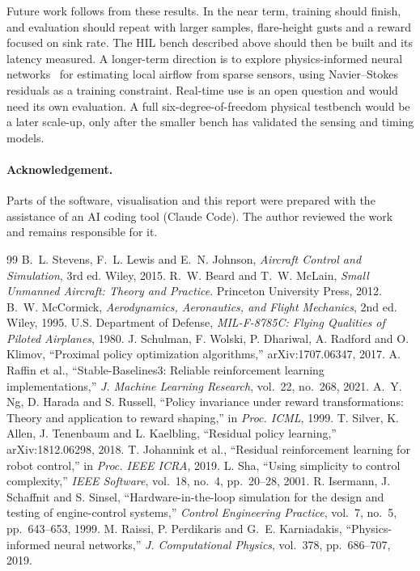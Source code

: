 \documentclass[10pt,a4paper]{article}
\begin{document}
Future work follows from these results. In the near term, training should finish, and
evaluation should repeat with larger samples, flare-height gusts and a reward focused on
sink rate. The HIL bench described above should then be built and its latency measured.
A longer-term direction is to explore physics-informed neural networks~\cite{raissi2019pinn}
for estimating local airflow from sparse sensors, using Navier--Stokes residuals as a
training constraint. Real-time use is an open question and would need its own evaluation.
A full six-degree-of-freedom physical testbench would be a later scale-up, only after
the smaller bench has validated the sensing and timing models.

\paragraph{Acknowledgement.} Parts of the software, visualisation and this report were
prepared with the assistance of an AI coding tool (Claude Code). The author reviewed the
work and remains responsible for it.

\begin{thebibliography}{99}\small\setlength{\itemsep}{1pt}
 B.~L. Stevens, F.~L. Lewis and E.~N. Johnson, \emph{Aircraft Control and Simulation}, 3rd ed. Wiley, 2015.
 R.~W. Beard and T.~W. McLain, \emph{Small Unmanned Aircraft: Theory and Practice}. Princeton University Press, 2012.
 B.~W. McCormick, \emph{Aerodynamics, Aeronautics, and Flight Mechanics}, 2nd ed. Wiley, 1995.
 U.S. Department of Defense, \emph{MIL-F-8785C: Flying Qualities of Piloted Airplanes}, 1980.
 J. Schulman, F. Wolski, P. Dhariwal, A. Radford and O. Klimov, ``Proximal policy optimization algorithms,'' arXiv:1707.06347, 2017.
 A. Raffin et al., ``Stable-Baselines3: Reliable reinforcement learning implementations,'' \emph{J. Machine Learning Research}, vol.~22, no.~268, 2021.
 A.~Y. Ng, D. Harada and S. Russell, ``Policy invariance under reward transformations: Theory and application to reward shaping,'' in \emph{Proc. ICML}, 1999.
 T. Silver, K. Allen, J. Tenenbaum and L. Kaelbling, ``Residual policy learning,'' arXiv:1812.06298, 2018.
 T. Johannink et al., ``Residual reinforcement learning for robot control,'' in \emph{Proc. IEEE ICRA}, 2019.
 L. Sha, ``Using simplicity to control complexity,'' \emph{IEEE Software}, vol.~18, no.~4, pp.~20--28, 2001.
 R. Isermann, J. Schaffnit and S. Sinsel, ``Hardware-in-the-loop simulation for the design and testing of engine-control systems,'' \emph{Control Engineering Practice}, vol.~7, no.~5, pp.~643--653, 1999.
 M. Raissi, P. Perdikaris and G.~E. Karniadakis, ``Physics-informed neural networks,'' \emph{J. Computational Physics}, vol.~378, pp.~686--707, 2019.
\end{thebibliography}
\end{document}
